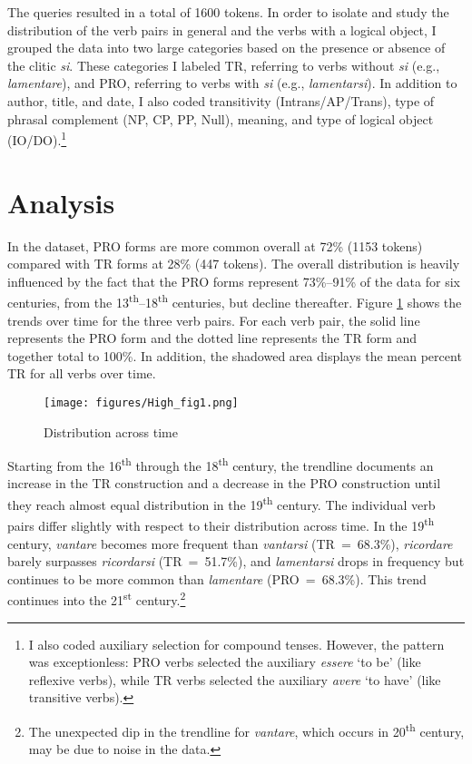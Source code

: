 \documentclass[output=paper,colorlinks,citecolor=brown]{langscibook}
\begin{document}
The queries resulted in a total of 1600 tokens. In order to isolate and study the distribution of the verb pairs in general and the verbs with a logical object, I grouped the data into two large categories based on the presence or absence of the clitic \textit{si}. These categories I labeled TR, referring to verbs without \textit{si} (e.g., \textit{lamentare}), and PRO, referring to verbs with \textit{si} (e.g., \textit{lamentarsi}). In addition to author, title, and date, I also coded transitivity (Intrans/AP/Trans), type of phrasal complement (NP, CP, PP, Null), meaning, and type of logical object (IO/DO).\footnote{I also coded auxiliary selection for compound tenses. However, the pattern was exceptionless: PRO verbs selected the auxiliary \textit{essere} ‘to be’ (like reflexive verbs), while TR verbs selected the auxiliary \textit{avere} ‘to have’ (like transitive verbs).}

\section{Analysis} \label{analysis}

In the dataset, PRO forms are more common overall at 72\% (1153 tokens) compared with TR forms at 28\% (447 tokens). The overall distribution is heavily influenced by the fact that the PRO forms represent 73\%--91\% of the data for six centuries, from the 13\textsuperscript{th}--18\textsuperscript{th} centuries, but decline thereafter. Figure \ref{fig:disttime} shows the trends over time for the three verb pairs. For each verb pair, the solid line represents the PRO form and the dotted line represents the TR form and together total to 100\%. In addition, the shadowed area displays the mean percent TR for all verbs over time.

\begin{figure}[h]

    \texttt{[image: figures/High\_fig1.png]}
    \caption{Distribution across time}
    \label{fig:disttime}
\end{figure}

Starting from the 16\textsuperscript{th} through the 18\textsuperscript{th} century, the trendline documents an increase in the TR construction and a decrease in the PRO construction until they reach almost equal distribution in the 19\textsuperscript{th} century. The individual verb pairs differ slightly with respect to their distribution across time. In the 19\textsuperscript{th} century, \textit{vantare} becomes more frequent than \textit{vantarsi} (TR~=~68.3\%), \textit{ricordare} barely surpasses \textit{ricordarsi} (TR~=~51.7\%), and \textit{lamentarsi} drops in frequency but continues to be more common than \textit{lamentare} (PRO~=~68.3\%). This trend continues into the 21\textsuperscript{st} century.\footnote{The unexpected dip in the trendline for \textit{vantare}, which occurs in 20\textsuperscript{th} century, may be due to noise in the data.}
\end{document}
